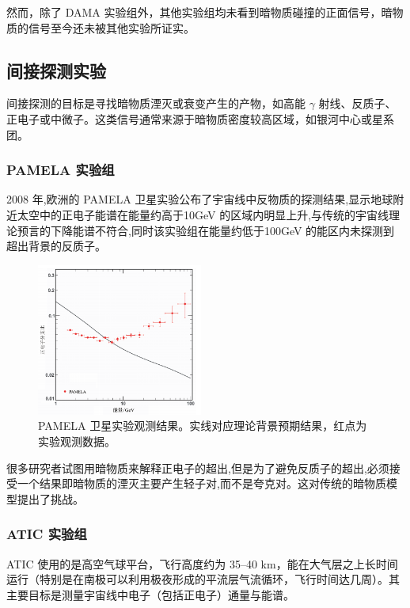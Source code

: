然而，除了 DAMA 实验组外，其他实验组均未看到暗物质碰撞的正面信号，暗物质的信号至今还未被其他实验所证实。

\subsection{间接探测实验}

间接探测的目标是寻找暗物质湮灭或衰变产生的产物，如高能 $\gamma$ 射线、反质子、正电子或中微子。这类信号通常来源于暗物质密度较高区域，如银河中心或星系团。

\subsubsection{PAMELA 实验组}

2008 年,欧洲的 PAMELA 卫星实验公布了宇宙线中反物质的探测结果,显示地球附近太空中的正电子能谱在能量约高于10GeV 的区域内明显上升,与传统的宇宙线理论预言的下降能谱不符合,同时该实验组在能量约低于100GeV 的能区内未探测到超出背景的反质子。

\begin{figure}[!htbp]
    \centering    
    \includegraphics[height=5cm]{Img/4-2.png}
    \caption{PAMELA 卫星实验观测结果。实线对应理论背景预期结果，红点为实验观测数据。 }
    \label{4-2}
\end{figure}

很多研究者试图用暗物质来解释正电子的超出,但是为了避免反质子的超出,必须接受一个结果即暗物质的湮灭主要产生轻子对,而不是夸克对。这对传统的暗物质模型提出了挑战。

\subsubsection{ATIC 实验组}

ATIC 使用的是高空气球平台，飞行高度约为 35–40 km，能在大气层之上长时间运行（特别是在南极可以利用极夜形成的平流层气流循环，飞行时间达几周）。其主要目标是测量宇宙线中电子（包括正电子）通量与能谱。



